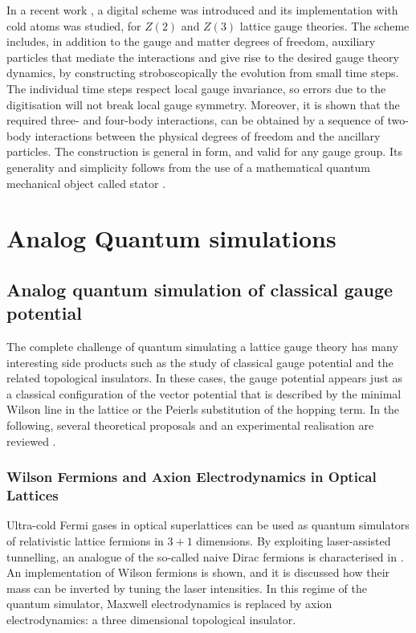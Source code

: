 \documentclass[epj,final]{svjour}
\begin{document}
In a recent work \cite{zohar2017digital,zohar2017digitalA}, a digital scheme was introduced and its implementation with cold atoms was studied, for $Z(2)$ and $Z(3)$ lattice gauge theories. The scheme includes, in addition to the gauge and matter degrees of freedom, auxiliary particles that mediate the interactions and give rise to the desired gauge theory dynamics, by constructing stroboscopically the evolution from small time steps. The individual time steps respect local gauge invariance, so errors due to the digitisation will not break local gauge symmetry. Moreover, it is shown that the required three- and four-body interactions, can be obtained by a sequence of two-body interactions between the physical degrees of freedom and the  ancillary particles. The construction is general in form, and valid for any gauge group. Its generality and simplicity follows from the use of a mathematical quantum mechanical object called stator \cite{reznik2002remote,zohar2017half}.

\section{Analog Quantum simulations}
\label{QS}

\subsection{Analog quantum simulation of classical gauge potential}

The complete challenge of quantum simulating a lattice gauge theory has many interesting side products such as the study of classical gauge potential and the related topological insulators. In these cases, the gauge potential appears just as a classical configuration of the vector potential that is described by the minimal Wilson line in the lattice or the Peierls substitution of the hopping term. In the following, several theoretical proposals and an experimental realisation are reviewed \cite{bermudez2010wilson,hauke2012non,mancini2015observation,alaeian2019creating}.

\subsubsection{Wilson Fermions and Axion Electrodynamics in Optical Lattices\cite{bermudez2010wilson}}

Ultra-cold Fermi gases in optical superlattices can be used as quantum simulators of relativistic lattice fermions in $3+1$ dimensions. By exploiting laser-assisted tunnelling, an analogue of the so-called naive Dirac fermions is characterised in \cite{bermudez2010wilson}. An implementation of Wilson fermions is shown, and it is discussed how their mass can be inverted by tuning the laser intensities. In this regime of the quantum simulator, Maxwell electrodynamics is replaced by axion electrodynamics: a three dimensional topological insulator.
\end{document}
